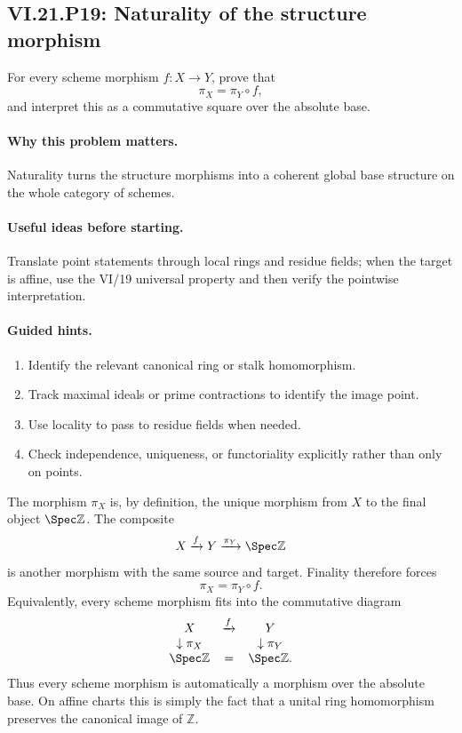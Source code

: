 \subsection*{VI.21.P19: Naturality of the structure morphism}
\begin{problem}\label{prob:vi21-p19}
For every scheme morphism $f:X\to Y$, prove that
\[
\pi_X=\pi_Y\circ f,
\]
and interpret this as a commutative square over the absolute base.
\end{problem}

\ifdefined\FullProblemDossiers
\paragraph{Why this problem matters.}
Naturality turns the structure morphisms into a coherent global base structure on the whole category of schemes.

\paragraph{Useful ideas before starting.}
Translate point statements through local rings and residue fields; when the target is affine, use the VI/19 universal property and then verify the pointwise interpretation.

\paragraph{Guided hints.}
\begin{enumerate}
\item Identify the relevant canonical ring or stalk homomorphism.
\item Track maximal ideals or prime contractions to identify the image point.
\item Use locality to pass to residue fields when needed.
\item Check independence, uniqueness, or functoriality explicitly rather than only on points.
\end{enumerate}

\begin{solution}
The morphism $\pi_X$ is, by definition, the unique morphism from $X$ to the final object
$\Spec\mathbb Z$.  The composite
\[
X\xrightarrow{f}Y\xrightarrow{\pi_Y}\Spec\mathbb Z
\]
is another morphism with the same source and target.  Finality therefore forces
\[
\pi_X=\pi_Y\circ f.
\]
Equivalently, every scheme morphism fits into the commutative diagram
\[
\begin{array}{ccc}
X&\xrightarrow{f}&Y\\
\downarrow\pi_X&&\downarrow\pi_Y\\
\Spec\mathbb Z&=&\Spec\mathbb Z.
\end{array}
\]
Thus every scheme morphism is automatically a morphism over the absolute base.  On affine charts
this is simply the fact that a unital ring homomorphism preserves the canonical image of
$\mathbb Z$.
\end{solution}

